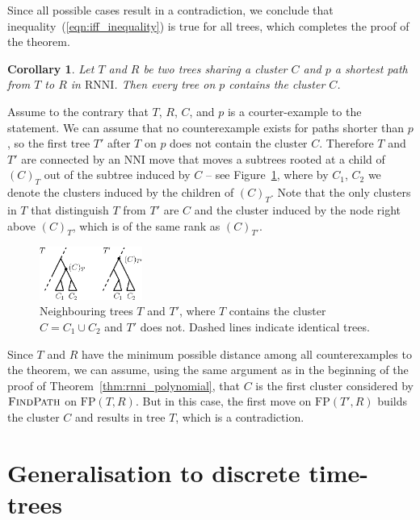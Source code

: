 \documentclass[11pt]{amsart}
\newtheorem{corollary}{Corollary}
\newcommand{\rnni}{\mathrm{RNNI}}
\newcommand{\findpath}{\textsc{FindPath}}
\newcommand{\nni}{\mathrm{NNI}}
\newcommand{\fp}{\mathrm{FP}}
\newcommand{\summary}[1]{} %
\begin{document}
Since all possible cases result in a contradiction, we conclude that inequality~(\ref{eqn:iff_inequality}) is true for all trees, which completes the proof of the theorem.
\endproof

\summary{Proving the Cluster Property for $\rnni$}

\begin{corollary}
	Let $T$ and $R$ be two trees sharing a cluster $C$ and $p$ a shortest path from $T$ to $R$ in $\rnni$.
	Then every tree on $p$ contains the cluster $C$.
	\label{cluster_thm}
\end{corollary}

\proof
	Assume to the contrary that $T$, $R$, $C$, and $p$ is a courter-example to the statement.
	We can assume that no counterexample exists for paths shorter than $p$, so the first tree $T'$ after $T$ on $p$ does not contain the cluster $C$.
	Therefore $T$ and $T'$ are connected by an $\nni$ move that moves a subtrees rooted at a child of $(C)_T$ out of the subtree induced by $C$ -- see Figure~\ref{fig:cluster_thm_proof}, where by $C_1$, $C_2$ we denote the clusters induced by the children of $(C)_T$.
	Note that the only clusters in $T$ that distinguish $T$ from $T'$ are $C$ and the cluster induced by the node right above $(C)_{T}$, which is of the same rank as $(C)_{T'}$.

	\begin{figure}[ht]
	\centering
	\includegraphics[width=0.3\textwidth]{cluster_thm_proof}
	\caption{Neighbouring trees $T$ and $T'$, where $T$ contains the cluster $C = C_1 \cup C_2$ and $T'$ does not.
	Dashed lines indicate identical trees.}
	\label{fig:cluster_thm_proof}
	\end{figure}

	Since $T$ and $R$ have the minimum possible distance among all counterexamples to the theorem, we can assume, using the same argument as in the beginning of the proof of Theorem~\ref{thm:rnni_polynomial}, that $C$ is the first cluster considered by $\findpath$ on $\fp(T, R)$.
	But in this case, the first move on $\fp(T',R)$ builds the cluster $C$ and results in tree $T$, which is a contradiction.
\endproof


\section{Generalisation to discrete time-trees}
\end{document}
